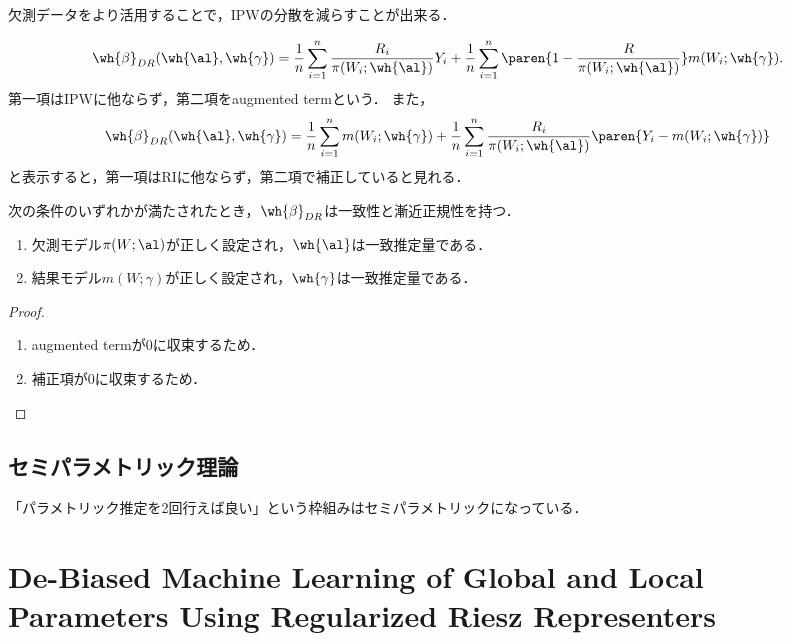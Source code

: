 \documentclass[uplatex,dvipdfmx]{jsreport}
\begin{document}
欠測データをより活用することで，IPWの分散を減らすことが出来る．

\[\wh{\beta}_{DR}(\wh{\al},\wh{\gamma})=\frac{1}{n}\sum^n_{i=1}\frac{R_i}{\pi(W_i;\wh{\al})}Y_i+\frac{1}{n}\sum^n_{i=1}\paren{1-\frac{R}{\pi(W_i;\wh{\al})}}m(W_i;\wh{\gamma}).\]
第一項はIPWに他ならず，第二項をaugmented termという．
また，
\[\wh{\beta}_{DR}(\wh{\al},\wh{\gamma})=\frac{1}{n}\sum^n_{i=1}m(W_i;\wh{\gamma})+\frac{1}{n}\sum^n_{i=1}\frac{R_i}{\pi(W_i;\wh{\al})}\paren{Y_i-m(W_i;\wh{\gamma})}\]
と表示すると，第一項はRIに他ならず，第二項で補正していると見れる．

\begin{theorem}[2重ロバスト性]
    次の条件のいずれかが満たされたとき，$\wh{\beta}_{DR}$は一致性と漸近正規性を持つ．
    \begin{enumerate}
        \item 欠測モデル$\pi(W;\al)$が正しく設定され，$\wh{\al}$は一致推定量である．
        \item 結果モデル$m(W;\gamma)$が正しく設定され，$\wh{\gamma}$は一致推定量である．
    \end{enumerate}
\end{theorem}
\begin{proof}\mbox{}
    \begin{enumerate}
        \item augmented termが$0$に収束するため．
        \item 補正項が$0$に収束するため．
    \end{enumerate}
\end{proof}

\subsection{セミパラメトリック理論}

\begin{tcolorbox}[colframe=ForestGreen, colback=ForestGreen!10!white,breakable,colbacktitle=ForestGreen!40!white,coltitle=black,fonttitle=\bfseries\sffamily,
title=]
    「パラメトリック推定を2回行えば良い」という枠組みはセミパラメトリックになっている．
\end{tcolorbox}

\section{De-Biased Machine Learning of Global and Local Parameters Using Regularized Riesz Representers \cite{Chernozhukov-Newey-Singh22-DebiasedMachineLearning}}
\end{document}
